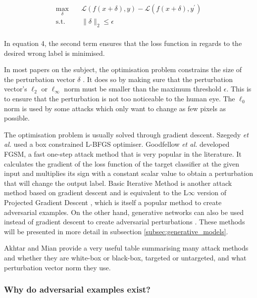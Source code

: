 \documentclass[11pt, a4paper, oneside]{article}
\begin{document}
\begin{equation}
\begin{aligned}
\max_{\delta} \quad & \mathcal{L}(f(x + \delta), y) - \mathcal{L}(f(x + \delta), y^\prime)\\
\textrm{s.t.} \quad& \|\delta\|_2\leq\epsilon   \\
\end{aligned}
\end{equation}

In equation 4, the second term ensures that the loss function in regards to the desired wrong label is minimised.

In most papers on the subject, the optimisation problem constrains the size of the perturbation vector $\delta$ \cite{akhtar, silva_survey, tnnls_survey}. It does so by making sure that the perturbation vector's $\ell_2$ or $\ell_\infty$ norm must be smaller than the maximum threshold $\epsilon$. This is to ensure that the perturbation is not too noticeable to the human eye. The $\ell_0$ norm is used by some attacks \cite{akhtar} which only want to change as few pixels as possible. 

The optimisation problem is usually solved through gradient descent. Szegedy \textit{et al.} \cite{szegedy2014intriguing} used a box constrained L-BFGS optimiser. Goodfellow \textit{et al.} \cite{fgsm} developed FGSM, a fast one-step attack method that is very popular in the literature. It calculates the gradient of the loss function of the target classifier at the given input and multiplies its sign with a constant scalar value to obtain a perturbation that will change the output label. Basic Iterative Method is another attack method based on gradient descent and is equivalent to the L$\infty$ version of Projected Gradient Descent \cite{madry2019deep}, which is itself a popular method to create adversarial examples. On the other hand, generative networks can also be used instead of gradient descent to create adversarial perturbations \cite{upset_angri, zheng_black_box_GAN, GANs_adversarial_attacks}. These methods will be presented in more detail in subsection \ref{subsec:generative_models}. 

Akhtar and Mian \cite{akhtar} provide a very useful table summarising many attack methods and whether they are white-box or black-box, targeted or untargeted, and what perturbation vector norm they use.

\subsubsection{Why do adversarial examples exist?}
\end{document}
